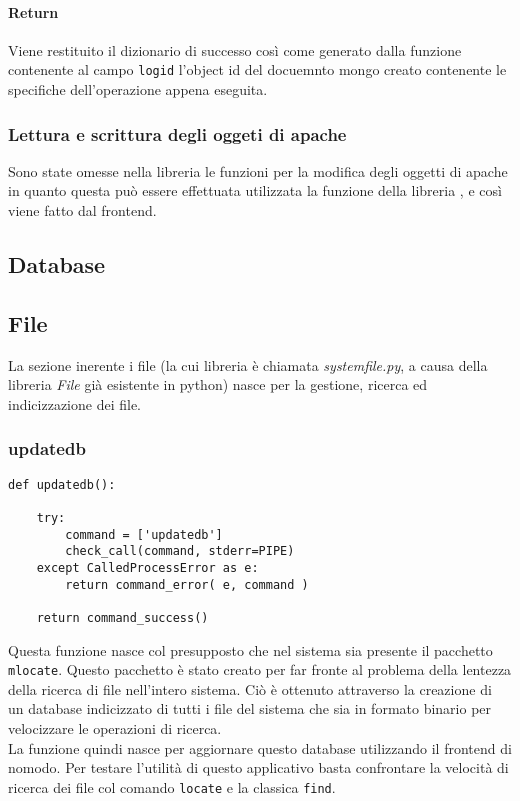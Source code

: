\documentclass[11pt]{article}
\begin{document}
\paragraph{Return}
Viene restituito il dizionario di successo così come generato dalla funzione  contenente
al campo \texttt{logid} l'object id del docuemnto mongo creato contenente le specifiche dell'operazione appena eseguita.

\subsubsection{Lettura e scrittura degli oggeti di apache}\label{apacheobjectswrite}
Sono state omesse nella libreria le funzioni per la modifica degli oggetti di apache in quanto questa può essere effettuata
utilizzata la funzione  della libreria , e così viene fatto dal frontend.

\subsection{Database}\label{database}
\subsection{File}\label{file}
La sezione inerente i file (la cui libreria è chiamata \textit{systemfile.py}, a causa della libreria \textit{File}
già esistente in python) nasce per la gestione, ricerca ed indicizzazione dei file.
\subsubsection{updatedb}\label{updatedb}
\begin{lstlisting}
def updatedb():

    try:
        command = ['updatedb']
        check_call(command, stderr=PIPE)
    except CalledProcessError as e:
        return command_error( e, command )

    return command_success()
\end{lstlisting}
Questa funzione nasce col presupposto che nel sistema sia presente il pacchetto \texttt{mlocate}. Questo pacchetto
è stato creato per far fronte al problema della lentezza della ricerca di file nell'intero sistema. Ciò è
ottenuto attraverso la creazione di un database indicizzato di tutti i file del sistema che sia in formato
binario per velocizzare le operazioni di ricerca.\\
La funzione quindi nasce per aggiornare questo database utilizzando il frontend di nomodo. Per testare
l'utilità di questo applicativo basta confrontare la velocità di ricerca dei file col comando \texttt{locate}
e la classica \texttt{find}.
\end{document}
